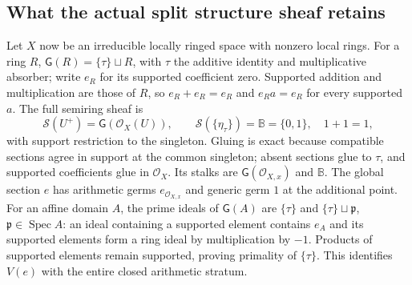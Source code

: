 \documentclass[11pt,a4paper]{article}
\theoremstyle{definition}\newtheorem{definition}[theorem]{Definition}
\newcommand{\Spec}{\operatorname{Spec}}\newcommand{\SpecMon}{\operatorname{Spec}_{\mathrm{mon}}}
\newcommand{\G}{\mathsf G}\newcommand{\Tor}{\operatorname{Tor}}\newcommand{\Frac}{\operatorname{Frac}}
\begin{document}
\subsection{What the actual split structure sheaf retains}
\label{sec:actual-semiring}

Let $X$ now be an irreducible locally ringed space with nonzero local
rings. For a ring $R$, $\G(R)=\{\tau\}\sqcup R$, with $\tau$ the
additive identity and multiplicative absorber; write $e_R$ for its
supported coefficient zero. Supported addition and multiplication
are those of $R$, so $e_R+e_R=e_R$ and $e_Ra=e_R$ for every supported
$a$. The full semiring sheaf is
\[
 \mathcal S(U^+)=\G(\mathcal O_X(U)),\qquad
 \mathcal S(\{\eta_\tau\})=\mathbb B=\{0,1\},\quad1+1=1,
 \tag{RP17}\label{eq:semiring-sheaf}
\]
with support restriction to the singleton. Gluing is exact because
compatible sections agree in support at the common singleton; absent
sections glue to $\tau$, and supported coefficients glue in
$\mathcal O_X$. Its stalks are $\G(\mathcal O_{X,x})$ and $\mathbb B$.
The global section $e$ has arithmetic germs $e_{\mathcal O_{X,x}}$
and generic germ $1$ at the additional point. For an affine domain
$A$, the prime ideals of $\G(A)$ are $\{\tau\}$ and
$\{\tau\}\sqcup\mathfrak p$, $\mathfrak p\in\Spec A$: an ideal
containing a supported element contains $e_A$ and its supported
elements form a ring ideal by multiplication by $-1$. Products of
supported elements remain supported, proving primality of $\{\tau\}$.
This identifies $V(e)$ with the entire closed arithmetic stratum.
\end{document}
